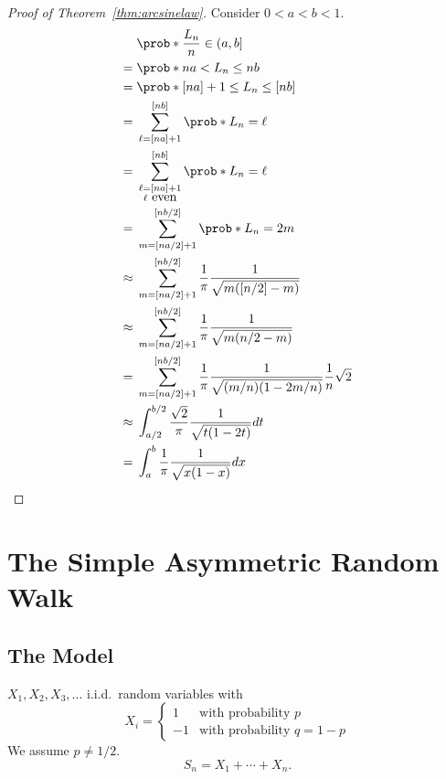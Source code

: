 \begin{proof}[Proof of Theorem~\ref{thm:arcsinelaw}]    
Consider $0<a<b<1$.
\begingroup
\begin{align*}
& \prob*{\frac{L_n}{n}\in(a,b]} \\
={} & \prob*{na<L_n\leq nb} \\
={} & \prob*{[na]+1\leq L_n\leq[nb]} \\
={} & \sum_{\ell = [na]+1}^{[nb]}
\prob*{L_n = \ell}\\
={} & \sum_{\substack{\ell = [na]+1\\ \ell \mbox{ even}}}^{[nb]}
\prob*{L_n = \ell}\\
={} & \sum_{m = [na/2]+1}^{[nb/2]}
\prob*{L_n = 2m}\\
\approx{} & \sum_{m = [na/2]+1}^{[nb/2]} 
\frac{1}{\pi}\frac{1}{\sqrt{m([n/2]-m)}}\\
\approx{} & \sum_{m=[na/2]+1}^{[nb/2]} 
\frac{1}{\pi}\frac{1}{\sqrt{m(n/2-m)}}\\
={} & \sum_{m=[na/2]+1}^{[nb/2]} 
\frac{1}{\pi}\frac{1}{\sqrt{(m/n)(1-2m/n)}}\frac{1}{n}\sqrt{2}\\
\approx{} & \int_{a/2}^{b/2}\frac{\sqrt{2}}{\pi}\frac{1}{\sqrt{t(1-2t)}}dt\\
={} & \int_{a}^{b}\frac{1}{\pi}\frac{1}{\sqrt{x(1-x)}}dx
\end{align*}
\endgroup
\end{proof}


\newpage


\chapter{The Simple Asymmetric Random Walk}

\section{The Model}

$X_1,X_2,X_3,\ldots$ i.i.d.\ random variables with
\begin{equation}
X_i = \begin{cases}
1 & \mbox{with probability } p\\
-1 & \mbox{with probability } q=1-p
\end{cases}
\end{equation}
We assume $p\neq 1/2$.
\begin{equation}
S_n = X_1+\cdots+X_n.
\end{equation}

